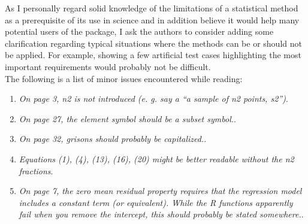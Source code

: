 \documentclass{article}
\begin{document}
As I personally regard solid knowledge of the limitations of a statistical method as a prerequisite of its use in science and in addition believe it would help many potential users of the package, I ask the authors to consider adding some clarification regarding typical situations where the methods can be or should not be applied. For example, showing a few artificial test cases highlighting the most important requirements would probably not be difficult.\\

The following is a list of minor issues encountered while reading:\\

\begin{enumerate}
	
	\item \textit{On page 3, n2 is not introduced (e. g. say a “a sample of n2 points, s2”)}.
	
	
	\item \textit{On page 27, the element symbol should be a subset symbol.}.
	
	
	\item \textit{On page 32, grisons should probably be capitalized.}.
	
	
	\item \textit{Equations (1), (4), (13), (16), (20) might be better readable without the n2 fractions}.
	
	
	\item \textit{On page 7, the zero mean residual property requires that the regression model includes a constant term (or equivalent). While the R functions apparently fail when you remove the intercept, this should probably be stated somewhere.}.
	
	
\end{enumerate} 
\end{document}
